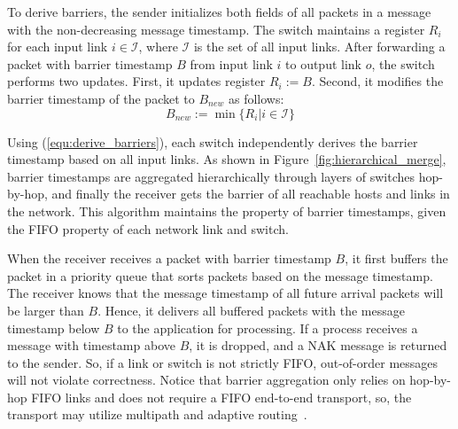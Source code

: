 To derive barriers, the sender initializes both fields of all packets in a message with the non-decreasing message timestamp. The switch maintains a register $R_i$ for each input link $i \in \mathcal{I}$, where $\mathcal{I}$ is the set of all input links. After forwarding a packet with barrier timestamp $B$ from input link $i$ to output link $o$, the switch performs two updates. First, it updates register $R_i := B$. Second, it modifies the barrier timestamp of the packet to $B_{new}$ as follows:
\begin{equation}\label{equ:derive_barriers}
B_{new}:=\min\{R_i| i\in \mathcal{I}\}
\end{equation}



Using (\ref{equ:derive_barriers}), each switch independently derives the barrier timestamp based on all input links.
As shown in Figure~\ref{fig:hierarchical_merge}, barrier timestamps are aggregated hierarchically through layers of switches hop-by-hop, and finally the receiver gets the barrier of all reachable hosts and links in the network.
This algorithm maintains the property of barrier timestamps, given the FIFO property of each network link and switch.



When the receiver receives a packet with barrier timestamp $B$, it first buffers the packet in a priority queue that sorts packets based on the message timestamp. The receiver knows that the message timestamp of all future arrival packets will be larger than $B$. Hence, it delivers all buffered packets with the message timestamp below $B$ to the application for processing.
If a process receives a message with timestamp above $B$, it is dropped, and a NAK message is returned to the sender. So, if a link or switch is not strictly FIFO, out-of-order messages will not violate correctness.
Notice that barrier aggregation only relies on hop-by-hop FIFO links and does not require a FIFO end-to-end transport, so, the transport may utilize multipath and adaptive routing~\cite{glass1992turn}.




